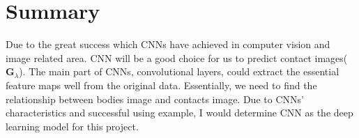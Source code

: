 \section{Summary}
Due to the great success which CNNs have achieved in computer vision and image related area. CNN will be a good choice for us to predict contact images($\pmb{G}_{\lambda}$). The main part of CNNs, convolutional layers, could extract the essential feature maps well from the original data. Essentially, we need to find the relationship between bodies image and contacts image. Due to CNNs' characteristics and successful using example, I would determine CNN as the deep learning model for this project.
